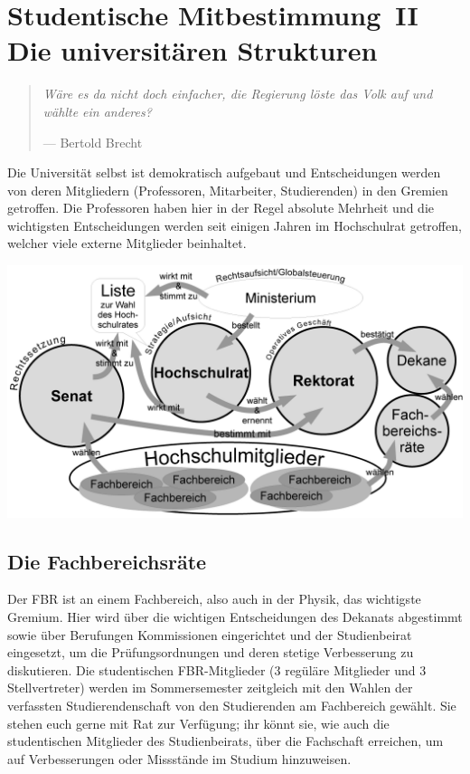 \clearpage

\section*{Studentische Mitbestimmung~II\\Die universitären Strukturen}
\begin{multicols*}{2}
\begin{quote}
	\textit{Wäre es da nicht doch einfacher, die Regierung löste das Volk auf und wählte ein anderes?}
	
	\hfill--- Bertold Brecht
\end{quote}
Die Universität selbst ist demokratisch aufgebaut und Entscheidungen werden von deren Mitgliedern (Professoren, Mitarbeiter, Studierenden) in den Gremien getroffen.
Die Professoren haben hier in der Regel absolute Mehrheit und die wichtigsten Entscheidungen werden seit einigen Jahren im Hochschulrat getroffen, welcher viele externe Mitglieder beinhaltet.

\includegraphics[width=\columnwidth]{res/uni_strukturen.png}

\subsection{Die Fachbereichsräte}
Der FBR ist an einem Fachbereich, also auch in der Physik, das wichtigste Gremium.
Hier wird über die wichtigen Entscheidungen des Dekanats abgestimmt sowie über Berufungen Kommissionen eingerichtet und der Studienbeirat eingesetzt, um die Prüfungsordnungen und deren stetige Verbesserung zu diskutieren.
Die studentischen FBR-Mitglieder (3 regüläre Mitglieder und 3 Stellvertreter) werden im Sommersemester zeitgleich mit den Wahlen der verfassten Studierendenschaft von den Studierenden am Fachbereich gewählt.
Sie stehen euch gerne mit Rat zur Verfügung; ihr könnt sie, wie auch die studentischen Mitglieder des Studienbeirats, über die Fachschaft erreichen, um auf Verbesserungen oder Missstände im Studium hinzuweisen.


\end{multicols*}
